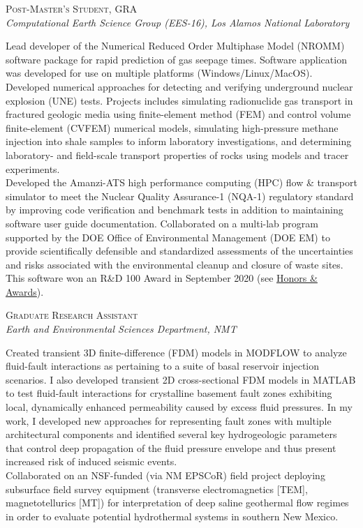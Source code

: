 \documentclass[11pt, letterpaper]{article}
\newcommand{\years}[1]{\marginnote{\scriptsize #1}}
\begin{document}
\years{2017 - 2019}\textsc{Post-Master's Student, GRA}\\
\textit{Computational Earth Science Group (EES-16), Los Alamos National Laboratory}
\begin{adjustwidth}{5pt}{0pt}
	Lead developer of the Numerical Reduced Order Multiphase Model (NROMM)
	software package for rapid prediction of gas seepage times. Software
	application was developed for use on multiple platforms
	(Windows/Linux/MacOS).\\
	Developed numerical approaches for detecting and verifying underground
	nuclear explosion (UNE) tests. Projects includes simulating
	radionuclide gas transport in fractured geologic media using finite-element
	method (FEM) and control volume finite-element (CVFEM) numerical models,
	simulating high-pressure methane injection into shale samples to inform
	laboratory investigations, and determining laboratory- and field-scale
	transport properties of rocks using models and tracer experiments.\\
	Developed the Amanzi-ATS high performance computing (HPC) flow \& transport
	simulator to meet the Nuclear Quality Assurance-1 (NQA-1) regulatory
	standard by improving code verification and benchmark tests in addition to
	maintaining software user guide documentation. Collaborated
	on a multi-lab program supported by the DOE Office of Environmental
	Management (DOE EM) to provide scientifically defensible and standardized
	assessments of the uncertainties and risks associated with the
	environmental cleanup and closure of waste sites. This software won
	an R\&D 100 Award in September 2020 (see \hyperref[sec:awards]{Honors \&
	Awards}).
\end{adjustwidth}

\years{2016 - 2017}\textsc{Graduate Research Assistant}\\
\textit{Earth and Environmental Sciences Department, NMT}
\begin{adjustwidth}{5pt}{0pt}
	Created transient 3D finite-difference (FDM) models in MODFLOW to analyze
	fluid-fault interactions as pertaining to a suite of basal reservoir
	injection scenarios. I also developed transient 2D cross-sectional FDM
	models in MATLAB to test fluid-fault interactions for crystalline basement
	fault zones exhibiting local, dynamically enhanced permeability caused by
	excess fluid pressures. In my work, I developed new approaches for
	representing fault zones with multiple architectural components and
	identified several key hydrogeologic parameters that control deep
	propagation of the fluid pressure envelope and thus present increased risk
	of induced seismic events.\\
	Collaborated on an NSF-funded (via NM EPSCoR) field project deploying
	subsurface field survey equipment (transverse electromagnetics [TEM],
	magnetotellurics [MT]) for interpretation of deep saline geothermal flow
	regimes in order to evaluate potential hydrothermal systems in southern New
	Mexico.
\end{adjustwidth}
\end{document}
